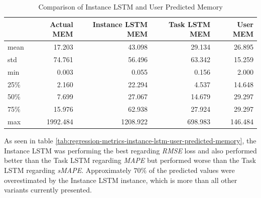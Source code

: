       \begin{table}
        \centering
        \caption{Comparison of Instance LSTM and User Predicted Memory}
        \label{tab:comparison-instance-lstm-user-predicted-memory}

        \begin{tabular}{|l|rrrr|}
          \toprule
          {} &  Actual MEM &  Instance LSTM MEM &  Task LSTM MEM &  User MEM \\
          \midrule
          mean &      17.203 &             43.098 &         29.134 &    26.895 \\
          std  &      74.761 &             56.496 &         63.342 &    15.259 \\
          min  &       0.003 &              0.055 &          0.156 &     2.000 \\
          25\%  &       2.160 &             22.294 &          4.537 &    14.648 \\
          50\%  &       7.699 &             27.067 &         14.679 &    29.297 \\
          75\%  &      15.976 &             62.938 &         27.924 &    29.297 \\
          max  &    1992.484 &           1208.922 &        698.983 &   146.484 \\
          \bottomrule
          \end{tabular}
      \end{table}
      As seen in table \ref{tab:regression-metrics-instance-lstm-user-predicted-memory}, the Instance LSTM was performing the best regarding \emph{RMSE} loss and also performed better than the Task LSTM regarding \emph{MAPE} but performed worse than the Task LSTM regarding \emph{sMAPE}.
      Approximately $70 \%$ of the predicted values were overestimated by the Instance LSTM instance, which is more than all other variants currently presented.
      
